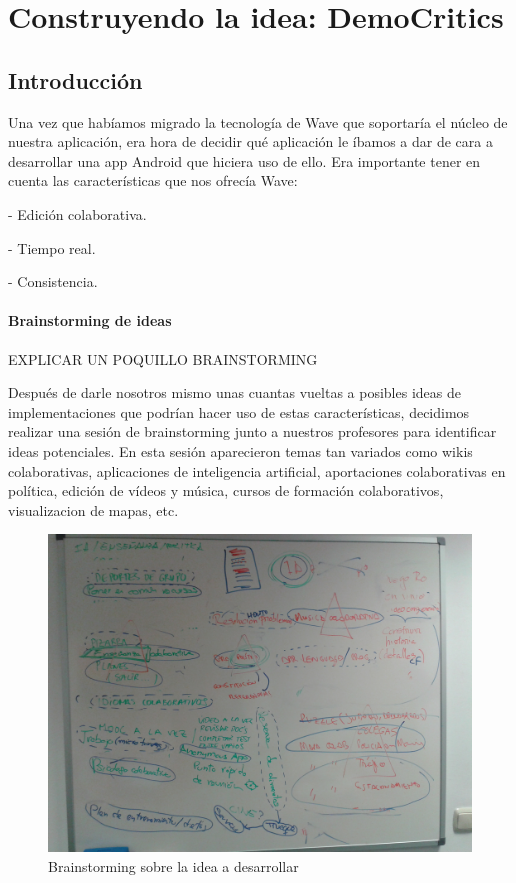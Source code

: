 \newpage
\thispagestyle{sectioned}
\chapter{Construyendo la idea: DemoCritics}

\section{Introducción}

Una vez que habíamos migrado la tecnología de Wave que soportaría el núcleo de nuestra aplicación, era hora de decidir qué aplicación le íbamos a dar de cara a desarrollar una app Android que hiciera uso de ello. Era importante tener en cuenta las características que nos ofrecía Wave:

 - Edición colaborativa.

 - Tiempo real.

 - Consistencia.
 
\subsubsection{Brainstorming de ideas}

EXPLICAR UN POQUILLO BRAINSTORMING

Después de darle nosotros mismo unas cuantas vueltas a posibles ideas de implementaciones que podrían hacer uso de estas características, decidimos realizar una sesión de brainstorming junto a nuestros profesores para identificar ideas potenciales. En esta sesión aparecieron temas tan variados como wikis colaborativas, aplicaciones de inteligencia artificial, aportaciones colaborativas en política, edición de vídeos y música, cursos de formación colaborativos, visualizacion de mapas, etc.

\begin{figure}[H]
\centering
\includegraphics[keepaspectratio, scale=0.15]{Media/Captures/brainstorming.jpg}
\caption{Brainstorming sobre la idea a desarrollar}
\label{fig:brainstorming}
\end{figure}

